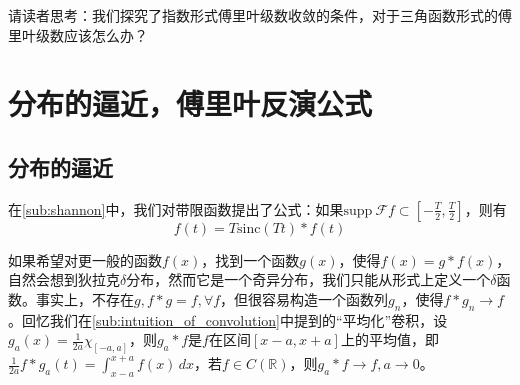 \documentclass{ctexbook}
\begin{document}
请读者思考：我们探究了指数形式傅里叶级数收敛的条件，对于三角函数形式的傅里叶级数应该怎么办？

\section{分布的逼近，傅里叶反演公式}\label{sec:Approach}

\subsection{分布的逼近}\label{sub:approach}
在\ref{sub:shannon}中，我们对带限函数提出了公式：如果$\text{supp}\ \mathcal{F} f\subset[-\frac{T}{2},\frac{T}{2}]$，则有
\begin{equation*}
    f(t)=T\text{sinc}(Tt)*f(t)
\end{equation*}

如果希望对更一般的函数$f(x)$，找到一个函数$g(x)$，使得$f(x)=g*f(x)$，自然会想到狄拉克$\delta$分布，然而它是一个奇异分布，我们只能从形式上定义一个$\delta$函数。事实上，不存在$g,f*g=f,\forall f$，但很容易构造一个函数列$g_n$，使得$f*g_n\to f$\cite{folland}。回忆我们在\ref{sub:intuition_of_convolution}中提到的“平均化”卷积，设$g_a(x)=\frac{1}{2a}\chi_{[-a,a]}$，则$g_a*f$是$f$在区间$[x-a,x+a]$上的平均值，即$\frac{1}{2a}f*g_a(t)=\int_{x-a}^{x+a}f(x)\,dx$，若$f\in C(\mathbb{R})$，则$g_a*f\to f,a\to 0$。
\end{document}
